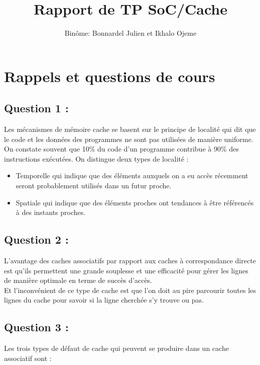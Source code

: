 \documentclass[11pt,a4paper]{article}
\begin{document}
\title{Rapport de TP SoC/Cache}
\author{Binôme: Bonnardel Julien et Ikhalo Ojeme}
\maketitle
\section{Rappels et questions de cours}
    \subsection{Question 1 :}
Les mécanismes de mémoire cache se basent sur le principe de localité qui dit
que le code et les données des programmes ne sont pas utilisées de manière
uniforme. On constate souvent que 10\% du code d'un programme contribue à 90\%
des instructions exécutées. On distingue deux types de localité : \\

\begin{itemize}
    \item Temporelle qui indique que des éléments auxquels on a eu accès
      récemment seront probablement utilisés dans un futur proche.
    \item Spatiale qui indique que des éléments proches ont tendances à être
      référencés à des instants proches.
\end{itemize}

    \subsection{Question 2 :}
    
L'avantage des caches associatifs par rapport aux caches à correspondance
directe est qu'ils permettent une grande souplesse et une efficacité pour gérer
les lignes de manière optimale en terme de succès d’accès. \\

Et l'inconvénient de ce type de cache est que l'on doit au pire parcourir toutes
les lignes du cache pour savoir si la ligne cherchée s’y trouve ou pas.
    
    \subsection{Question 3 :}
    
Les trois types de défaut de cache qui peuvent se produire dans un cache
associatif sont : \\
\end{document}
